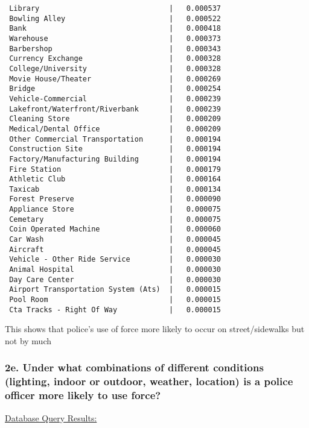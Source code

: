 \documentclass[10pt]{article}
\begin{document}
\begin{verbatim}
 Library                              |   0.000537
 Bowling Alley                        |   0.000522
 Bank                                 |   0.000418
 Warehouse                            |   0.000373
 Barbershop                           |   0.000343
 Currency Exchange                    |   0.000328
 College/University                   |   0.000328
 Movie House/Theater                  |   0.000269
 Bridge                               |   0.000254
 Vehicle-Commercial                   |   0.000239
 Lakefront/Waterfront/Riverbank       |   0.000239
 Cleaning Store                       |   0.000209
 Medical/Dental Office                |   0.000209
 Other Commercial Transportation      |   0.000194
 Construction Site                    |   0.000194
 Factory/Manufacturing Building       |   0.000194
 Fire Station                         |   0.000179
 Athletic Club                        |   0.000164
 Taxicab                              |   0.000134
 Forest Preserve                      |   0.000090
 Appliance Store                      |   0.000075
 Cemetary                             |   0.000075
 Coin Operated Machine                |   0.000060
 Car Wash                             |   0.000045
 Aircraft                             |   0.000045
 Vehicle - Other Ride Service         |   0.000030
 Animal Hospital                      |   0.000030
 Day Care Center                      |   0.000030
 Airport Transportation System (Ats)  |   0.000015
 Pool Room                            |   0.000015
 Cta Tracks - Right Of Way            |   0.000015
\end{verbatim}

This shows that police's use of force more likely to occur on street/sidewalks but not by much

\subsubsection*{2e. Under what combinations of different conditions (lighting, indoor or outdoor, weather, location) is a police officer more likely to use force?}

\underline{Database Query Results:}
\end{document}
